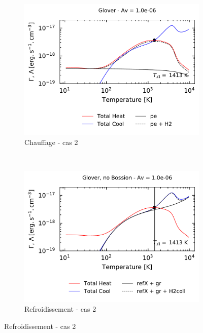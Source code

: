 \begin{figure}[!p]
    \begin{subfigure}[t]{0.49\textwidth} %
        \centering \includegraphics[trim = {0 0 0 1cm },clip,width=1\textwidth]{figure/H2/instabiliteH2/glover/GC_h_1p0em06_pe_h2.pdf}
        \caption{Chauffage - cas 2}
    \end{subfigure}
    ~ 
    \begin{subfigure}[t]{0.49\textwidth}
        \centering \includegraphics[trim = {0 0 0 1cm },clip,width=1\textwidth]{figure/H2/instabiliteH2/glover/GC_c_1p0em06_refx_gr_h2coll.pdf}
        \caption{Refroidissement - cas 2}
    \end{subfigure}
    

\end{figure}
